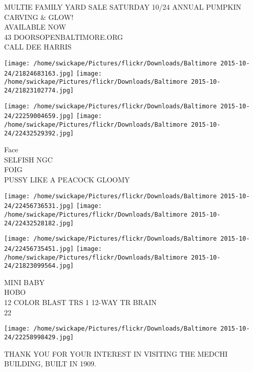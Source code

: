 \documentclass[10pt,letterpaper]{article}
\begin{document}
MULTIE FAMILY YARD SALE SATURDAY 10/24 ANNUAL PUMPKIN CARVING \& GLOW!\\
AVAILABLE NOW\\
43 DOORSOPENBALTIMORE.ORG\\
CALL DEE HARRIS
\pagebreak

\texttt{[image: /home/swickape/Pictures/flickr/Downloads/Baltimore 2015-10-24/21824683163.jpg]}
\texttt{[image: /home/swickape/Pictures/flickr/Downloads/Baltimore 2015-10-24/21823102774.jpg]}

\texttt{[image: /home/swickape/Pictures/flickr/Downloads/Baltimore 2015-10-24/22259004659.jpg]}
\texttt{[image: /home/swickape/Pictures/flickr/Downloads/Baltimore 2015-10-24/22432529392.jpg]}

Face\\
SELFISH NGC\\
FOIG\\
PUSSY LIKE A PEACOCK GLOOMY
\pagebreak

\texttt{[image: /home/swickape/Pictures/flickr/Downloads/Baltimore 2015-10-24/22456736531.jpg]}
\texttt{[image: /home/swickape/Pictures/flickr/Downloads/Baltimore 2015-10-24/22432528182.jpg]}

\texttt{[image: /home/swickape/Pictures/flickr/Downloads/Baltimore 2015-10-24/22456735451.jpg]}
\texttt{[image: /home/swickape/Pictures/flickr/Downloads/Baltimore 2015-10-24/21823099564.jpg]}

MINI BABY\\
HOBO\\
12 COLOR BLAST TRS 1 12{-}WAY TR BRAIN\\
22
\pagebreak

\texttt{[image: /home/swickape/Pictures/flickr/Downloads/Baltimore 2015-10-24/22258998429.jpg]}

THANK YOU FOR YOUR INTEREST IN VISITING THE MEDCHI BUILDING, BUILT IN 1909.
\pagebreak
\end{document}
